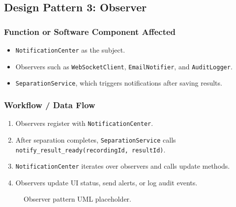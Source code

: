\documentclass[12pt,a4paper]{report}
\begin{document}
\subsection{Design Pattern 3: Observer}

\subsubsection*{Function or Software Component Affected}
\begin{itemize}[nosep]
  \item \texttt{NotificationCenter} as the subject.
  \item Observers such as \texttt{WebSocketClient}, \texttt{EmailNotifier}, and \texttt{AuditLogger}.
  \item \texttt{SeparationService}, which triggers notifications after saving results.
\end{itemize}

\subsubsection*{Workflow / Data Flow}
\begin{enumerate}[nosep]
  \item Observers register with \texttt{NotificationCenter}.
  \item After separation completes, \texttt{SeparationService} calls \texttt{notify\_result\_ready(recordingId, resultId)}.
  \item \texttt{NotificationCenter} iterates over observers and calls update methods.
  \item Observers update UI status, send alerts, or log audit events.
\end{enumerate}

\begin{figure}[h]
  \centering
  \caption{Observer pattern UML placeholder.}
\end{figure}
\end{document}
